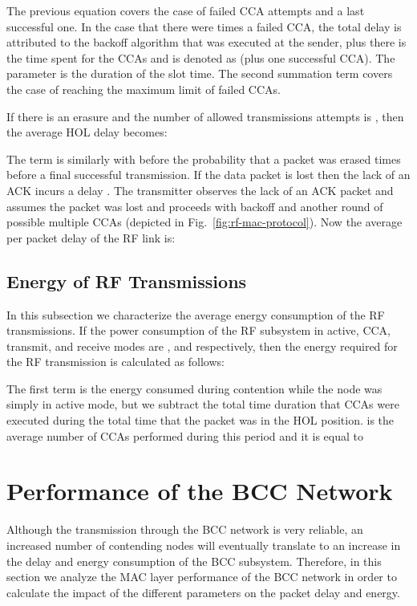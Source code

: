 \documentclass[10pt]{IEEEtran}
\newcounter{section:outage-analysis}
\begin{document}
The previous equation covers the case of  failed CCA attempts and a last successful one.  In the case that there were  times a failed CCA, the total delay is attributed to the backoff algorithm that was executed at the sender, plus there is the time spent for the  CCAs and is denoted as  (plus one successful CCA). The parameter  is the duration of the slot time. The second summation term covers the case of reaching the maximum limit of  failed CCAs.

If there is an erasure and the number of allowed transmissions attempts is , then the average HOL delay becomes:

The term  is similarly with before the probability that a packet was erased  times before a final successful transmission. If the data packet is lost then the lack of an ACK incurs a delay . The transmitter observes the lack of an ACK packet and assumes the packet was lost and proceeds with backoff and another round of possible multiple CCAs (depicted in Fig.~\ref{fig:rf-mac-protocol}). Now the average per packet delay of the RF link is:


\subsection{Energy of RF Transmissions}
In this subsection we characterize the average energy consumption of the RF transmissions. If the power consumption of the RF subsystem in active, CCA, transmit, and receive modes are , and  respectively, then the energy required for the RF transmission is calculated as follows:

The first term is the energy consumed during contention while the node was simply in active mode, but we subtract the total time duration that CCAs were executed during the total time that the packet was in the HOL position.  is the average number of CCAs performed during this period and it is equal to




\section{Performance of the BCC Network}
\label{section:bcc-model}
Although the transmission through the BCC network is very reliable, an increased number of contending nodes will eventually translate to an increase in the delay and energy consumption of the BCC subsystem. Therefore, in this section we analyze the MAC layer performance of the BCC network in order to calculate the impact of the different parameters on the packet delay and energy.
\end{document}
